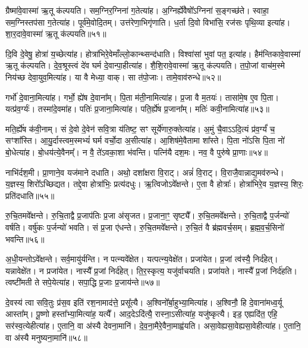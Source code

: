 ग्रैष्मा॑वे॒वास्मा॑ ऋ॒तू क॑ल्पयति। 
सम॒ग्निर॒ग्निना॑ ग॒तेत्या॑ह। 
अ॒ग्निर्ह्ये॑वैषो᳚ऽग्निना॑ स॒ङ्गच्छ॑ते। 
स्वाहा॒ सम॒ग्निस्तप॑सा ग॒तेत्या॑ह। 
पूर्व॑मे॒वोदि॒तम्। 
उत्त॑रेणा॒भिगृ॑णाति। 
ध॒र्ता दि॒वो विभा॑सि॒ रज॑सः पृथि॒व्या इत्या॑ह। 
शा॒र॒दावे॒वास्मा॑ ऋ॒तू क॑ल्पयति॥५१॥

दि॒वि दे॒वेषु॒ होत्रा॑ य॒च्छेत्या॑ह। 
होत्रा॑भिरे॒वेमाँल्लो॒कान्थ्सन्द॑\-धाति। 
विश्वा॑सां भुवां पत॒ इत्या॑ह। 
हैम॑न्तिकावे॒वास्मा॑ ऋ॒तू क॑ल्पयति। 
दे॒व॒श्रूस्त्वं दे॑व घर्म दे॒वान्पा॒हीत्या॑ह। 
शै॒शि॒रावे॒वास्मा॑ ऋ॒तू क॑ल्पयति। 
त॒पो॒जां वाच॑म॒स्मे निय॑च्छ देवा॒युव॒मित्या॑ह। 
या वै मेध्या॒ वाक्। 
सा त॑पो॒जाः। 
तामे॒वाव॑रुन्धे॥५२॥

गर्भो॑ दे॒वाना॒मित्या॑ह। 
गर्भो॒ ह्ये॑ष दे॒वाना᳚म्। 
पि॒ता म॑ती॒नामित्या॑ह। 
प्र॒जा वै म॒तयः॑। 
तासा॑मे॒ष ए॒व पि॒ता। 
यत्प्र॑व॒र्ग्यः॑। 
तस्मा॑दे॒वमा॑ह। 
पतिः॑ प्र॒जाना॒मित्या॑ह। 
पति॒र्ह्ये॑ष प्र॒जाना᳚म्। 
मतिः॑ कवी॒ना\-मित्या॑ह॥५३॥

मति॒र्ह्ये॑ष क॑वी॒नाम्। 
सं दे॒वो दे॒वेन॑ सवि॒त्रा य॑तिष्ट॒ सꣳ सूर्ये॑णारु॒क्तेत्या॑ह। 
अ॒मुं चै॒वाऽऽदि॒त्यं प्र॑व॒र्ग्यं॑ च॒ सꣳशा᳚स्ति। 
आ॒यु॒र्दास्त्वम॒स्मभ्यं॑ घर्म वर्चो॒दा अ॒सीत्या॑ह। 
आ॒शिष॑मे॒वैतामा शा᳚स्ते। 
पि॒ता नो॑ऽसि पि॒ता नो॑ बो॒धेत्या॑ह। 
बो॒धय॑त्ये॒वैनम्᳚। 
न वै॒ ते॑ऽवका॒शा भ॑वन्ति। 
पत्नि॑यै दश॒मः। 
नव॒ वै पुरु॑षे प्रा॒णाः॥५४॥

नाभि॑र्दश॒मी। 
प्रा॒णाने॒व यज॑माने दधाति। 
अथो॒ दशा᳚क्षरा वि॒राट्। 
अन्नं॑  वि॒राट्। 
वि॒राजै॒वान्नाद्य॒मव॑रुन्धे। 
य॒ज्ञस्य॒ शिरो᳚ऽच्छिद्यत। 
तद्दे॒वा होत्रा॑भिः॒ प्रत्य॑दधुः। 
ऋ॒त्विजोऽवे᳚क्षन्ते। 
ए॒ता वै होत्राः᳚। 
होत्रा॑भिरे॒व य॒ज्ञस्य॒ शिरः॒ प्रति॑दधाति॥५५॥

रु॒चि॒तमवे᳚क्षन्ते। 
रु॒चि॒ताद्वै प्र॒जाप॑तिः प्र॒जा अ॑सृजत। 
प्र॒जाना॒ꣳ॒ सृष्ट्यै᳚। 
रु॒चि॒तमवे᳚क्षन्ते। 
रु॒चि॒ताद्वै प॒र्जन्यो॑ वर्\mbox{}षति। 
वर्\mbox{}षु॑कः प॒र्जन्यो॑ भवति। 
सं प्र॒जा ए॑धन्ते। 
रु॒चि॒तमवे᳚क्षन्ते। 
रु॒चि॒तं वै ब्र॑ह्मवर्च॒सम्। 
ब्र॒ह्म॒व॒र्च॒सिनो॑ भवन्ति॥५६॥

अ॒धी॒यन्तोऽवे᳚क्षन्ते। 
सर्व॒मायु॑र्\mbox{}यन्ति। 
न पत्न्यवे᳚क्षेत। 
यत्पत्न्य॒वेक्षे॑त। 
प्रजा॑येत। 
प्र॒जां त्व॑स्यै॒ निर्द॑हेत्। 
यन्नावेक्षे॑त। 
न प्रजा॑येत। 
नास्यै᳚ प्र॒जां निर्द॑हेत्। 
ति॒र॒स्कृत्य॒ यजु॑र्वाचयति। 
प्रजा॑यते। 
नास्यै᳚ प्र॒जां निर्द॑हति। 
त्वष्टी॑मती ते सपे॒येत्या॑ह। 
सपा॒द्धि प्र॒जाः प्र॒जाय॑न्ते॥५७॥

दे॒वस्य॑ त्वा सवि॒तुः प्र॑स॒व इति॑ रश॒नामाद॑त्ते॒ प्रसू᳚त्यै। 
अ॒श्विनो᳚र्बा॒हुभ्या॒मित्या॑ह। 
अ॒श्विनौ॒ हि दे॒वाना॑मध्व॒र्यू आस्ता᳚म्। 
पू॒ष्णो हस्ता᳚भ्या॒मित्या॑ह॒ यत्यै᳚। 
आद॒देऽदि॑त्यै॒ रास्ना॒ऽसीत्या॑ह॒ यजु॑ष्कृत्यै। 
इड॒ एह्यदि॑त॒ एहि॒ सर॑स्व॒त्येहीत्या॑ह। 
ए॒तानि॒ वा अ॑स्यै देवना॒मानि॑। 
दे॒व॒ना॒मैरे॒वैना॒माह्व॑यति। 
असा॒वेह्यसा॒वेह्यसा॒वेहीत्या॑ह। 
ए॒तानि॒ वा अ॑स्यै मनुष्यना॒मानि॑॥५८॥

